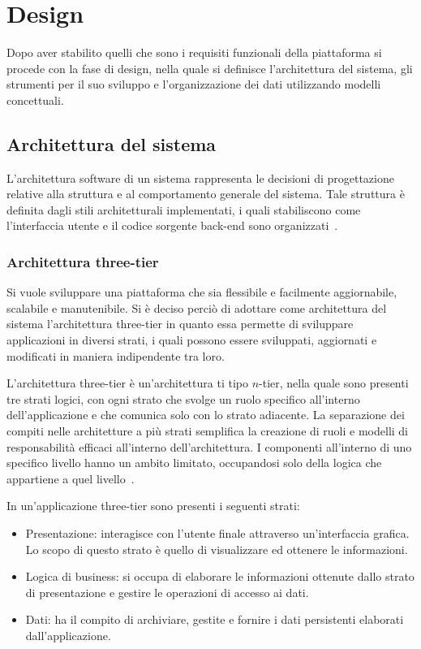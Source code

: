\chapter{Design}\label{cap:design}
Dopo aver stabilito quelli che sono i requisiti funzionali della piattaforma si procede con la fase di design, nella quale si definisce l'architettura del sistema, gli strumenti per il suo sviluppo e l'organizzazione dei dati utilizzando modelli concettuali.

\section{Architettura del sistema}
L'architettura software di un sistema rappresenta le decisioni di progettazione relative alla struttura e al comportamento generale del sistema. Tale struttura  \`e definita dagli stili architetturali implementati, i quali stabiliscono come l'interfaccia utente e il codice sorgente back-end sono organizzati~\cite{FordRichards}.

\subsection{Architettura three-tier}
Si vuole sviluppare una piattaforma che sia flessibile e facilmente aggiornabile, scalabile e manutenibile. Si \`e deciso perci\`o di adottare come architettura del sistema l'architettura three-tier in quanto essa permette di sviluppare applicazioni in diversi strati, i quali possono essere sviluppati, aggiornati e modificati in maniera indipendente tra loro.

L'architettura three-tier \`e un'architettura ti tipo $ n $-tier, nella quale sono presenti tre strati logici, con ogni strato che svolge un ruolo specifico all'interno dell'applicazione e che comunica solo con lo strato adiacente. La separazione dei compiti nelle architetture a pi\`u strati semplifica la creazione di ruoli e modelli di responsabilit\`a efficaci all'interno dell'architettura. I componenti all'interno di uno specifico livello hanno un ambito limitato, occupandosi solo della logica che appartiene a quel livello~\cite{FordRichards2}.

In un'applicazione three-tier sono presenti i seguenti strati:
\begin{itemize}
	\item Presentazione: interagisce con l'utente finale attraverso un'interfaccia grafica. Lo scopo di questo strato \`e quello di visualizzare ed ottenere le informazioni.
	\item Logica di business: si occupa di elaborare le informazioni ottenute dallo strato di presentazione e gestire le operazioni di accesso ai dati.
	\item Dati: ha il compito di archiviare, gestite e fornire i dati persistenti elaborati dall'applicazione.
\end{itemize}

